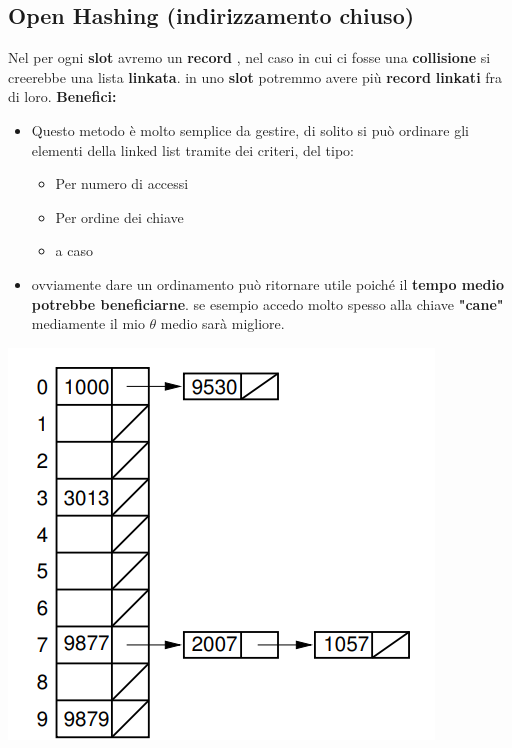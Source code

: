 \begin{itemize}
\subsection{Open Hashing (indirizzamento chiuso)}
Nel \textbf{\textcolor{blue}{}} per ogni \textbf{slot} avremo un \textbf{record} , nel caso in cui ci fosse una \textbf{collisione} si creerebbe una lista \textbf{linkata}. in uno \textbf{slot} potremmo avere più \textbf{record} \textbf{linkati} fra di loro. \newline\newline
\textbf{Benefici:}
\begin{itemize}
    \item Questo metodo è molto semplice da gestire, di solito si può ordinare gli elementi della linked list tramite dei criteri, del tipo:
    \begin{itemize}
        \item Per numero di accessi
        \item Per ordine dei chiave
        \item a caso
    \end{itemize}
    \item  ovviamente dare un ordinamento può ritornare utile poiché il \textbf{tempo medio potrebbe beneficiarne}. se esempio accedo molto spesso alla chiave \textbf{"cane"} mediamente il mio $\theta$ medio sarà migliore.
\end{itemize}
    \begin{center}
        \includegraphics[scale = 0.6]{Capitoli/HashTable/Esempi/OpenHashing.png}
    \end{center}
\end{itemize}
